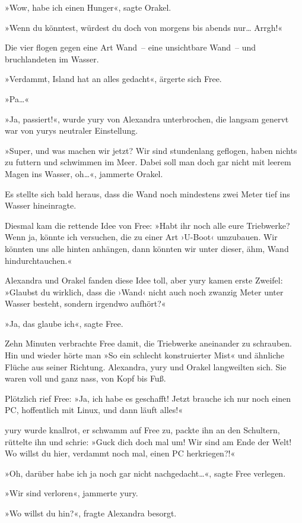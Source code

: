»Wow, habe ich einen Hunger«, sagte Orakel.

»Wenn du könntest, würdest du doch von morgens bis abends nur… Arrgh!«

Die vier flogen gegen eine Art Wand~– eine unsichtbare Wand~– und bruchlandeten im Wasser.

»Verdammt, Island hat an alles gedacht«, ärgerte sich Free.

»Pa…«

»Ja, passiert!«, wurde yury von Alexandra unterbrochen, die langsam genervt war von yurys neutraler Einstellung.

»Super, und was machen wir jetzt? Wir sind stundenlang geflogen, haben nichts zu futtern und schwimmen im Meer. Dabei soll man doch gar nicht mit leerem Magen ins Wasser, oh…«, jammerte Orakel.

Es stellte sich bald heraus, dass die Wand noch mindestens zwei Meter tief ins Wasser hineinragte.

Diesmal kam die rettende Idee von Free: »Habt ihr noch alle eure Triebwerke? Wenn ja, könnte ich versuchen, die zu einer Art ›U-Boot‹ umzubauen. Wir könnten uns alle hinten anhängen, dann könnten wir unter dieser, ähm, Wand hindurchtauchen.«

Alexandra und Orakel fanden diese Idee toll, aber yury kamen erste Zweifel: »Glaubst du wirklich, dass die ›Wand‹ nicht auch noch zwanzig Meter unter Wasser besteht, sondern irgendwo aufhört?«

»Ja, das glaube ich«, sagte Free.

Zehn Minuten verbrachte Free damit, die Triebwerke aneinander zu schrauben. Hin und wieder hörte man »So ein schlecht konstruierter Mist« und ähnliche Flüche aus seiner Richtung. Alexandra, yury und Orakel langweilten sich. Sie waren voll und ganz nass, von Kopf bis Fuß.

Plötzlich rief Free: »Ja, ich habe es geschafft! Jetzt brauche ich nur noch einen PC, hoffentlich mit Linux, und dann läuft alles!«

yury wurde knallrot, er schwamm auf Free zu, packte ihn an den Schultern, rüttelte ihn und schrie: »Guck dich doch mal um! Wir sind am Ende der Welt! Wo willst du hier, verdammt noch mal, einen PC herkriegen?!«

»Oh, darüber habe ich ja noch gar nicht nachgedacht…«, sagte Free verlegen.

»Wir sind verloren«, jammerte yury.

»Wo willst du hin?«, fragte Alexandra besorgt.

